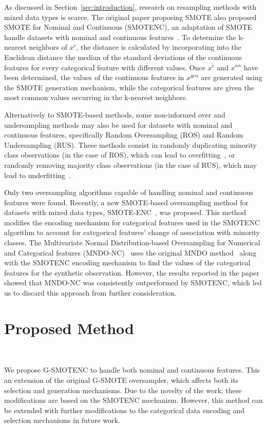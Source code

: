 \documentclass[parskip=full]{scrartcl}
\begin{document}
As discussed in Section~\ref{sec:introduction}, research on resampling methods
with mixed data types is scarce. The original paper proposing SMOTE also
proposed SMOTE for Nominal and Continuous (SMOTENC), an adaptation of SMOTE
handle datasets with nominal and continuous features~\cite{Chawla2002}. To
determine the k-nearest neighbors of $x^c$, the distance is calculated by
incorporating into the Euclidean distance the median of the standard
deviations of the continuous features for every categorical feature with
different values. Once $x^c$ and $x^{nn}$ have been determined, the values of
the continuous features in $x^{gen}$ are generated using the SMOTE generation
mechanism, while the categorical features are given the most common values
occurring in the k-nearest neighbors.

Alternatively to SMOTE-based methods, some non-informed over and undersampling
methods may also be used for datasets with nominal and continuous features,
specifically Random Oversampling (ROS) and Random Undersampling (RUS). These
methods consist in randomly duplicating minority class observations (in the
case of ROS), which can lead to overfitting~\cite{park2021combined,
batista2004study}, or randomly removing majority class observations (in the
case of RUS), which may lead to underfitting~\cite{bansal2021analysis}.

Only two oversampling algorithms capable of handling nominal and continuous
features were found. Recently, a new SMOTE-based oversampling method for
datasets with mixed data types, SMOTE-ENC~\cite{mukherjee2021smote}, was
proposed. This method modifies the encoding mechanism for categorical features
used in the SMOTENC algorithm to account for categorical features' change of
association with minority classes. The Multivariate Normal Distribution-based
Oversampling for Numerical and Categorical features
(MNDO-NC)~\cite{ambai2019multivariate} uses the original MNDO
method~\cite{ambai2018mndo} along with the SMOTENC encoding mechanism to find
the values of the categorical features for the synthetic observation. However,
the results reported in the paper showed that MNDO-NC was consistently
outperformed by SMOTENC, which led us to discard this approach from further
consideration.

\section{Proposed Method}~\label{sec:proposed_method}

We propose G-SMOTENC to handle both nominal and continuous features.  This an
extension of the original G-SMOTE oversampler, which affects both its
selection and generation mechanisms. Due to the novelty of the work, these
modifications are based on the SMOTENC mechanism. However, this method can be
extended with further modifications to the categorical data encoding and
selection mechanisms in future work. 
\end{document}
